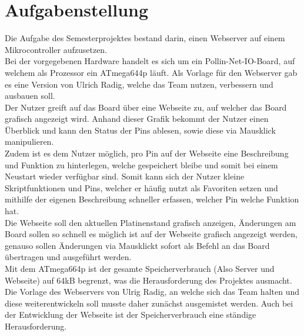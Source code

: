 \chapter{Aufgabenstellung}

Die Aufgabe des Semesterprojektes bestand darin, einen Webserver auf einem Mikrocontroller aufzusetzen.\\
Bei der vorgegebenen Hardware handelt es sich um ein Pollin-Net-IO-Board, auf welchem als Prozessor ein ATmega644p 
läuft. Als Vorlage für den Webserver gab es eine Version von Ulrich Radig, welche das Team nutzen, verbessern und ausbauen soll.\\
Der Nutzer greift auf das Board über eine Webseite zu, auf welcher das Board grafisch angezeigt wird. Anhand dieser Grafik 
bekommt der Nutzer einen Überblick und kann den Status der Pins ablesen, sowie diese via Mausklick manipulieren.\\
Zudem ist es dem Nutzer möglich, pro Pin auf der Webseite eine Beschreibung und Funktion zu 
hinterlegen, welche gespeichert bleibe und somit bei einem Neustart wieder verfügbar sind. Somit kann sich der Nutzer kleine Skriptfunktionen und Pins, 
welcher er häufig nutzt als Favoriten setzen und mithilfe der eigenen Beschreibung schneller erfassen, welcher Pin welche Funktion hat.\\
Die Webseite soll den aktuellen Platinenstand grafisch anzeigen, Änderungen am Board sollen so 
schnell es möglich ist auf der Webseite grafisch angezeigt werden, genauso sollen Änderungen via Mausklickt sofort als Befehl 
an das Board übertragen und ausgeführt werden.\\
Mit dem ATmega664p ist der gesamte Speicherverbrauch (Also Server und Webseite) auf 64kB begrenzt, was die Herausforderung des  
Projektes ausmacht. Die Vorlage des Webservers von Ulrig Radig, an welche sich das Team halten und diese weiterentwickeln soll 
musste daher zunächst ausgemistet werden. Auch bei der Entwicklung der Webseite ist der Speicherverbrauch eine ständige Herausforderung.\\

